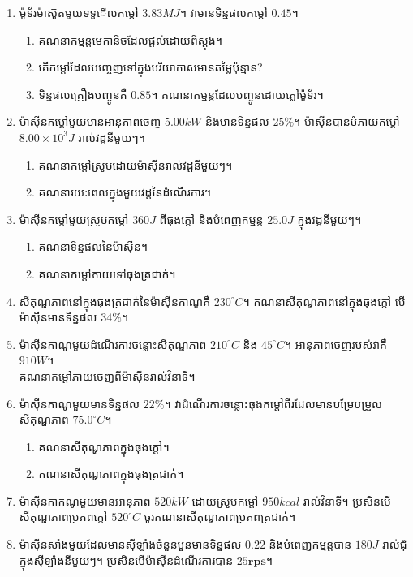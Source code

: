 \begin{enumerate}
		\item ម៉ូទ័រម៉ាស៊ូតមួយទទួើលកម្តៅ $3.83MJ$។ វាមានទិន្នផលកម្តៅ $0.45$។
		\begin{enumerate}
			\item គណនាកម្មន្តមេកានិចដែលផ្តល់ដោយពិស្តុង។
			\item តើកម្តៅដែលបញ្ចេញទៅក្នុងបរិយាកាសមានតម្លៃប៉ុន្មាន?
			\item ទិន្នផលគ្រឿងបញ្ចូនគឺ $0.85$។
			គណនាកម្មន្តដែលបញ្ចូនដោយភ្លៅម៉ូទ័រ។
		\end{enumerate}
		\item ម៉ាសុីនកម្តៅមួយមានអានុភាពចេញ $5.00kW$ និងមានទិន្នផល $25\%$។ ម៉ាសុីនបានបំភាយកម្តៅ $8.00\times10^{3}J$ រាល់វដ្តនីមួយៗ។
		\begin{enumerate}
			\item គណនាកម្តៅស្រូបដោយម៉ាសុីនរាល់វដ្តនីមួយៗ។
			\item គណនារយៈពេលក្នុងមួយវដ្តនៃដំណើរការ។
		\end{enumerate}
		\item ម៉ាសុីនកម្តៅមួយស្រូបកម្តៅ $360J$ ពីធុងក្តៅ និងបំពេញកម្មន្ត $25.0J$ ក្នុងវដ្តនីមួយៗ។
		\begin{enumerate}
			\item គណនាទិន្នផលនៃម៉ាសុីន។
			\item គណនាកម្តៅភាយទៅធុងត្រជាក់។
		\end{enumerate}
		\item សីតុណ្ហភាពនៅក្នុងធុងត្រជាក់នៃម៉ាសុីនកាណូគឺ $230^\circ C$។ គណនាសីតុណ្ហភាពនៅក្នុងធុងក្តៅ បើម៉ាសុីនមានទិន្នផល $34\%$។
		\item ម៉ាសុីនកាណូមួយដំណើរការចន្លោះសីតុណ្ហភាព $210^\circ C$ និង $45^\circ C$។ អានុភាពចេញរបស់វាគឺ $910W$។\\ គណនាកម្តៅភាយចេញពីម៉ាសុីនរាល់វិនាទី។
		\item ម៉ាសុីនកាណូមួយមានទិន្នផល $22\%$។ វាដំណើរការចន្លោះធុងកម្តៅពីរដែលមានបម្រែបម្រួលសីតុណ្ហភាព $75.0^\circ C$។
		\begin{enumerate}
			\item គណនាសីតុណ្ហភាពក្នុងធុងក្តៅ។
			\item គណនាសីតុណ្ហភាពក្នុងធុងត្រជាក់។
		\end{enumerate}
		\item ម៉ាសុីនកាកណូមួយមានអានុភាព $520kW$ ដោយស្រូបកម្តៅ $950kcal$ រាល់វិនាទី។ ប្រសិនបើសីតុណ្ហភាពប្រភពក្តៅ $520^\circ C$ ចូរគណនាសីតុណ្ហភាពប្រភពត្រជាក់។
		\item ម៉ាសុីនសាំងមួយដែលមានសុីឡាំងចំនួនបួនមានទិន្នផល $0.22$ និងបំពេញកម្មន្តបាន $180J$ រាល់ជុំក្នុងសុីឡាំងនីមួយៗ។ ប្រសិនបើម៉ាសុីនដំណើរការបាន $25\mathbf{rps}$។
		\begin{enumerate}

\end{enumerate}
\end{enumerate}
